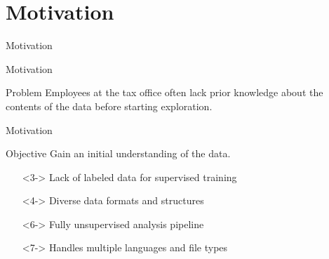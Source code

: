 \section{Motivation}
\begin{frame}{Motivation}
\end{frame}

\begin{frame}{Motivation} 
    \begin{alertblock}{Problem} 
    Employees at the tax office often lack prior knowledge about the contents of the data before starting exploration.
    \end{alertblock}

\end{frame}


\begin{frame}{Motivation} 
    \begin{exampleblock}{Objective} 
    Gain an initial understanding of the data.
    \end{exampleblock}

    \begin{itemize}
        \item[\ding{55}]<3-> Lack of labeled data for supervised training
        \item[\ding{55}]<4-> Diverse data formats and structures
    \end{itemize}

    \begin{itemize}
        \item[\ding{51}]<6-> Fully unsupervised analysis pipeline
        \item[\ding{51}]<7-> Handles multiple languages and file types
    \end{itemize}
\end{frame}